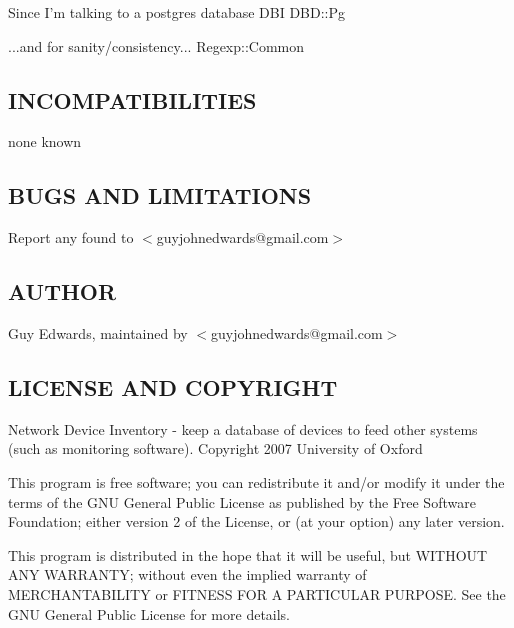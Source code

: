 \documentclass{book}
\begin{document}
Since I'm talking to a postgres database DBI DBD::Pg



...and for sanity/consistency... Regexp::Common


\subsection{INCOMPATIBILITIES}
\label{Inventory_INCOMPATIBILITIES}
\hypertarget{Inventory_INCOMPATIBILITIES}{}



none known


\subsection{BUGS AND LIMITATIONS}
\label{Inventory_BUGS_AND_LIMITATIONS}
\hypertarget{Inventory_BUGS_AND_LIMITATIONS}{}



Report any found to $<$guyjohnedwards@gmail.com$>$


\subsection{AUTHOR}
\label{Inventory_AUTHOR}
\hypertarget{Inventory_AUTHOR}{}



Guy Edwards, maintained by $<$guyjohnedwards@gmail.com$>$


\subsection{LICENSE AND COPYRIGHT}
\label{Inventory_LICENSE_AND_COPYRIGHT}
\hypertarget{Inventory_LICENSE_AND_COPYRIGHT}{}



Network Device Inventory - keep a database of devices to feed other systems (such as monitoring software). Copyright 2007 University of Oxford



This program is free software; you can redistribute it and/or modify it under the terms of the GNU General Public License as published by the Free Software Foundation; either version 2 of the License, or (at your option) any later version.



This program is distributed in the hope that it will be useful, but WITHOUT ANY WARRANTY; without even the implied warranty of MERCHANTABILITY or FITNESS FOR A PARTICULAR PURPOSE. See the GNU General Public License for more details.
\end{document}
